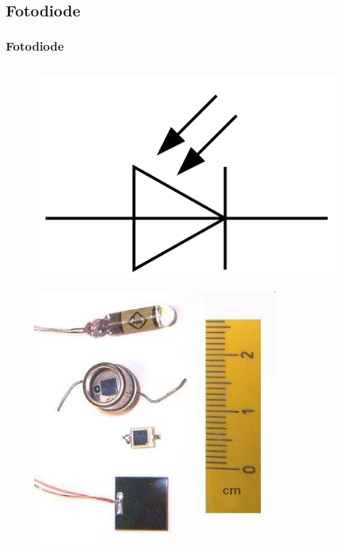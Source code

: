 \subsection*{Fotodiode}
\begin{frame}
  \frametitle{Fotodiode}
  \begin{columns}[c]
    \begin{center}
      \begin{figure}
        \includegraphics[width=1\textwidth,height=.15\textheight,keepaspectratio]{a05/Symbol_Photodiode.png}
      \end{figure}
      \begin{figure}
        \includegraphics[width=0.8\textwidth,height=.4\textheight,keepaspectratio]{a05/Fotodio.jpg}

\end{figure}
\end{center}
\end{columns}
\end{frame}
